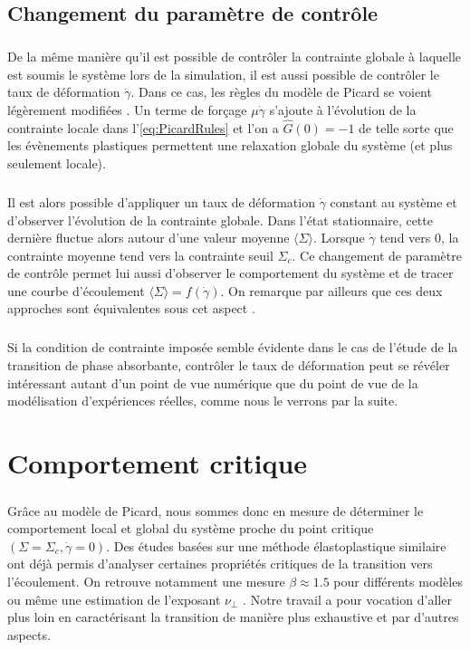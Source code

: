 \subsection{Changement du paramètre de contrôle}

\subparagraph{}De la même manière qu'il est possible de contrôler la contrainte globale à laquelle est soumis le système lors de la simulation, il est aussi possible de contrôler le taux de déformation $\dot{\gamma}$. Dans ce cas, les règles du modèle de Picard se voient légèrement modifiées \cite{picard_slow_2005}. Un terme de forçage $\mu\dot{\gamma}$ s'ajoute à l'évolution de la contrainte locale dans l'\autoref{eq:PicardRules} et l'on a $\hat{G}(0) = -1$ de telle sorte que les évènements plastiques permettent une relaxation globale du système (et plus seulement locale).

\subparagraph{}Il est alors possible d'appliquer un taux de déformation $\dot{\gamma}$ constant au système et d'observer l'évolution de la contrainte globale. Dans l'état stationnaire, cette dernière fluctue alors autour d'une valeur moyenne $\langle \Sigma\rangle$. Lorsque $\dot{\gamma}$ tend vers $0$, la contrainte moyenne tend vers la contrainte seuil $\Sigma_c$. Ce changement de paramètre de contrôle permet lui aussi d'observer le comportement du système et de tracer une courbe d'écoulement $\langle \Sigma \rangle = f(\dot{\gamma})$. On remarque par ailleurs que ces deux approches sont équivalentes sous cet aspect \cite{liu_driving_2016}.

\subparagraph{}Si la condition de contrainte imposée semble évidente dans le cas de l'étude de la transition de phase absorbante, contrôler le taux de déformation peut se révéler intéressant autant d'un point de vue numérique que du point de vue de la modélisation d'expériences réelles, comme nous le verrons par la suite.

\section{Comportement critique}

\subparagraph{}Grâce au modèle de Picard, nous sommes donc en mesure de déterminer le comportement local et global du système proche du point critique $(\Sigma = \Sigma_c, \dot{\gamma} = 0)$. Des études basées sur une méthode élastoplastique similaire ont déjà permis d'analyser certaines propriétés critiques de la transition vers l'écoulement. On retrouve notamment une mesure $\beta\approx 1.5$ pour différents modèles \cite{lin_scaling_2014, liu_driving_2016, ferrero_criticality_2019} ou même une estimation de l'exposant $\nu_\perp$ \cite{lin_scaling_2014}. Notre travail a pour vocation d'aller plus loin en caractérisant la transition de manière plus exhaustive et par d'autres aspects. 

